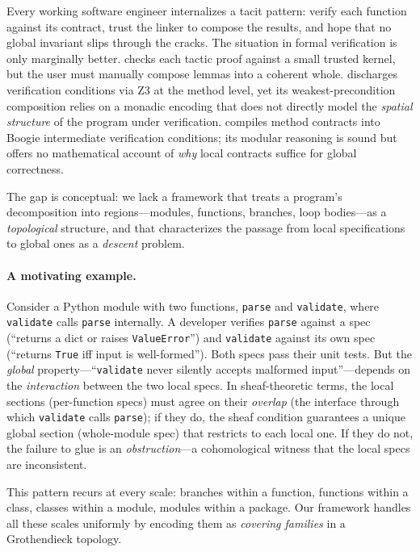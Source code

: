 \documentclass[11pt]{article}
\begin{document}
\medskip\noindent
Every working software engineer internalizes a tacit pattern: verify
each function against its contract, trust the linker to compose the results,
and hope that no global invariant slips through the cracks.  The situation in
formal verification is only marginally better.  \LEAN{} checks each tactic proof
against a small trusted kernel, but the user must manually compose lemmas into
a coherent whole.  \Fstar{} discharges verification conditions via Z3 at the
method level, yet its weakest-precondition composition relies on a monadic
encoding that does not directly model the \emph{spatial structure} of the
program under verification.  \Dafny{} compiles method contracts into Boogie
intermediate verification conditions; its modular reasoning is sound but offers
no mathematical account of \emph{why} local contracts suffice for global
correctness.

The gap is conceptual: we lack a framework that treats a program's
decomposition into regions---modules, functions, branches, loop bodies---as a
\emph{topological} structure, and that characterizes the passage from local
specifications to global ones as a \emph{descent} problem.

\paragraph{A motivating example.}
Consider a Python module with two functions, \texttt{parse} and
\texttt{validate}, where \texttt{validate} calls \texttt{parse} internally.
A developer verifies \texttt{parse} against a spec (``returns a dict or
raises \texttt{ValueError}'') and \texttt{validate} against its own spec
(``returns \texttt{True} iff input is well-formed'').  Both specs pass their
unit tests.  But the \emph{global} property---``\texttt{validate} never
silently accepts malformed input''---depends on the \emph{interaction}
between the two local specs.  In sheaf-theoretic terms, the local sections
(per-function specs) must agree on their \emph{overlap} (the interface
through which \texttt{validate} calls \texttt{parse}); if they do, the sheaf
condition guarantees a unique global section (whole-module spec) that restricts
to each local one.  If they do not, the failure to glue is an
\emph{obstruction}---a cohomological witness that the local specs are
inconsistent.

This pattern recurs at every scale: branches within a function, functions
within a class, classes within a module, modules within a package.  Our
framework handles all these scales uniformly by encoding them as
\emph{covering families} in a Grothendieck topology.
\end{document}
